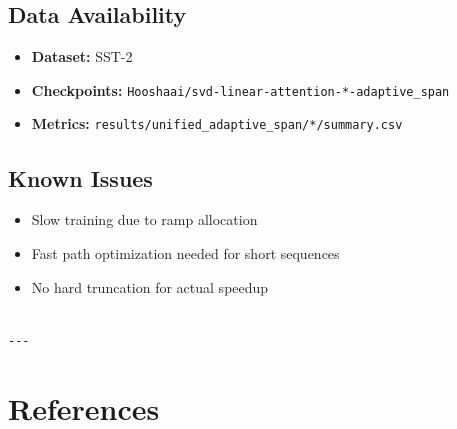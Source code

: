 \subsection{Data Availability}

\begin{itemize}
\item \textbf{Dataset:} SST-2
\item \textbf{Checkpoints:} \texttt{Hooshaai/svd-linear-attention-*-adaptive\_span}
\item \textbf{Metrics:} \texttt{results/unified\_adaptive\_span/*/summary.csv}

\end{itemize}
\subsection{Known Issues}

\begin{itemize}
\item Slow training due to ramp allocation
\item Fast path optimization needed for short sequences
\item No hard truncation for actual speedup
\end{itemize}
\begin{lstlisting}

---
\end{lstlisting}


\section{References}

